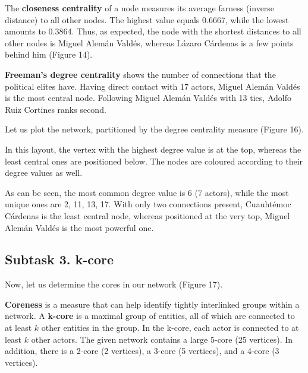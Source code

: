 
The \textbf{closeness centrality} of a node measures its average farness (inverse distance) to all other nodes. The highest value equals 0.6667, while the lowest amounts to 0.3864. Thus, as expected, the node with the shortest distances to all other nodes is Miguel Alemán Valdés, whereas Lázaro Cárdenas is a few points behind him (Figure 14).


\textbf{Freeman’s degree centrality} shows the number of connections that the political elites have. Having direct contact with 17 actors, Miguel Alemán Valdés is the most central node. Following Miguel Alemán Valdés with 13 ties, Adolfo Ruiz Cortines ranks second.

\FloatBarrier


Let us plot the network, partitioned by the degree centrality measure (Figure 16).


In this layout, the vertex with the highest degree value is at the top, whereas the least central ones are positioned below. The nodes are coloured according to their degree values as well.

As can be seen, the most common degree value is 6 (7 actors), while the most unique ones are 2, 11, 13, 17. With only two connections present, Cuauhtémoc Cárdenas is the least central node, whereas positioned at the very top, Miguel Alemán Valdés is the most powerful one.


\FloatBarrier
\clearpage


\subsection{Subtask 3. k-core}
Now, let us determine the cores in our network (Figure 17).


\textbf{Coreness} is a measure that can help identify tightly interlinked groups within a network. A \textbf{k-core} is a maximal group of entities, all of which are connected to at least $k$ other entities in the group. In the k-core, each actor is connected to at least $k$ other actors. The given network contains a large 5-core (25 vertices). In addition, there is a 2-core (2 vertices), a 3-core (5 vertices), and a 4-core (3 vertices). 

